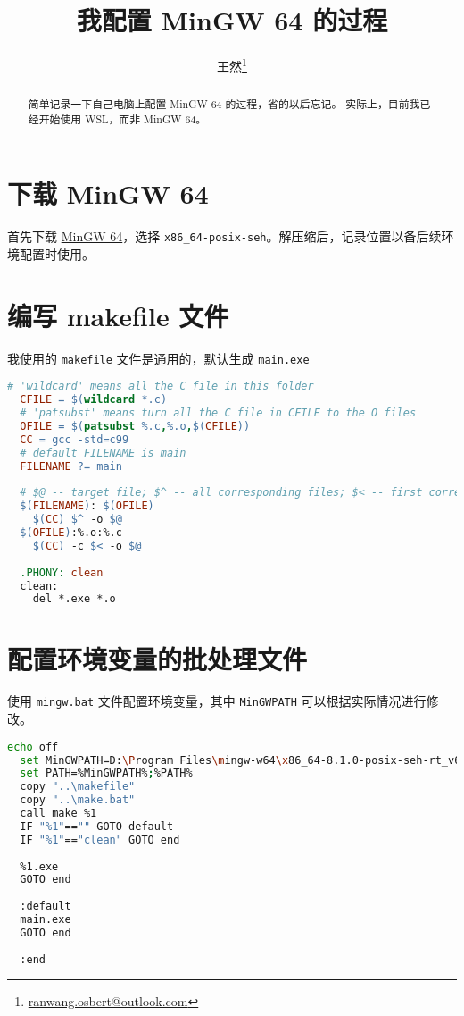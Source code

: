 \documentclass{ctexart}
\title{我配置 MinGW 64 的过程}
\author{王然\thanks{\url{ranwang.osbert@outlook.com}}}
\begin{document}
  
\maketitle

\begin{abstract}
  简单记录一下自己电脑上配置 MinGW 64 的过程，省的以后忘记。
  实际上，目前我已经开始使用 WSL，而非 MinGW 64。
\end{abstract}

\section{下载 MinGW 64}

首先下载 \href{https://sourceforge.net/projects/mingw-w64/files/mingw-w64/}{MinGW 64}，选择 \texttt{x86\_64-posix-seh}。解压缩后，记录位置以备后续环境配置时使用。

\section{编写 makefile 文件}

我使用的 \texttt{makefile} 文件是通用的，默认生成 \texttt{main.exe}

\begin{lstlisting}[language=make]
  # 'wildcard' means all the C file in this folder
  CFILE = $(wildcard *.c)
  # 'patsubst' means turn all the C file in CFILE to the O files
  OFILE = $(patsubst %.c,%.o,$(CFILE))
  CC = gcc -std=c99
  # default FILENAME is main
  FILENAME ?= main
  
  # $@ -- target file; $^ -- all corresponding files; $< -- first corresponding files
  $(FILENAME): $(OFILE)
  	$(CC) $^ -o $@
  $(OFILE):%.o:%.c
  	$(CC) -c $< -o $@
   
  .PHONY: clean
  clean:
  	del *.exe *.o
\end{lstlisting}

\section{配置环境变量的批处理文件}

使用 \texttt{mingw.bat} 文件配置环境变量，其中 \texttt{MinGWPATH} 可以根据实际情况进行修改。

\begin{lstlisting}[language = bash]
  echo off
  set MinGWPATH=D:\Program Files\mingw-w64\x86_64-8.1.0-posix-seh-rt_v6-rev0\mingw64\bin
  set PATH=%MinGWPATH%;%PATH%
  copy "..\makefile"
  copy "..\make.bat"
  call make %1
  IF "%1"=="" GOTO default
  IF "%1"=="clean" GOTO end
  
  %1.exe
  GOTO end
  
  :default
  main.exe
  GOTO end
  
  :end
\end{lstlisting}
\end{document}
